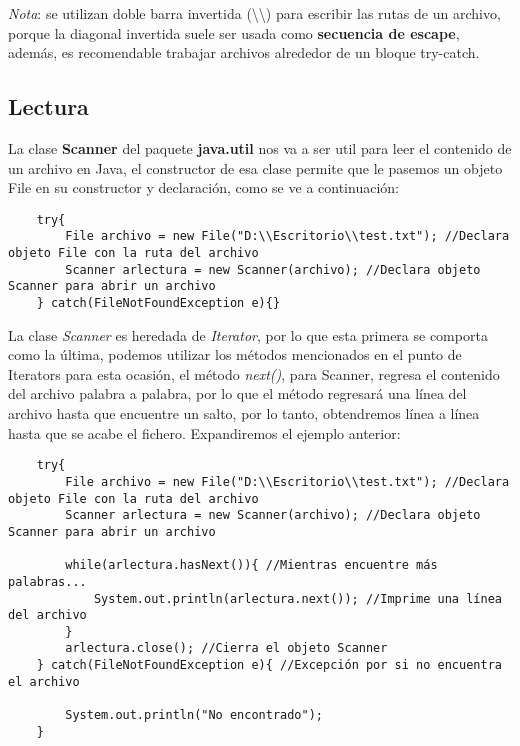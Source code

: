\textit{Nota}: se utilizan doble barra invertida (\textbackslash\textbackslash) para escribir las rutas de un archivo, porque la diagonal invertida suele ser usada como \textbf{secuencia de escape}, además, es recomendable trabajar archivos alrededor de un bloque try-catch.


\subsection{Lectura}
\hspace{0.55cm}La clase \textbf{Scanner} del paquete \textbf{java.util} nos va a ser util para leer el contenido de un archivo en Java, el constructor de esa clase permite que le pasemos un objeto File en su constructor y declaración, como se ve a continuación:
\begin{lstlisting}
    try{
        File archivo = new File("D:\\Escritorio\\test.txt"); //Declara objeto File con la ruta del archivo
        Scanner arlectura = new Scanner(archivo); //Declara objeto Scanner para abrir un archivo
    } catch(FileNotFoundException e){}
\end{lstlisting}

La clase \textit{Scanner} es heredada de \textit{Iterator}, por lo que esta primera se comporta como la última, podemos utilizar los métodos mencionados en el punto de Iterators para esta ocasión, el método \textit{next()}, para Scanner, regresa el contenido del archivo palabra a palabra, por lo que el método regresará una línea del archivo hasta que encuentre un salto, por lo tanto, obtendremos línea a línea hasta que se acabe el fichero. Expandiremos el ejemplo anterior:
\begin{lstlisting}
    try{
        File archivo = new File("D:\\Escritorio\\test.txt"); //Declara objeto File con la ruta del archivo
        Scanner arlectura = new Scanner(archivo); //Declara objeto Scanner para abrir un archivo
        
        while(arlectura.hasNext()){ //Mientras encuentre más palabras...
            System.out.println(arlectura.next()); //Imprime una línea del archivo
        }
        arlectura.close(); //Cierra el objeto Scanner
    } catch(FileNotFoundException e){ //Excepción por si no encuentra el archivo
    
        System.out.println("No encontrado");
    }
\end{lstlisting}


